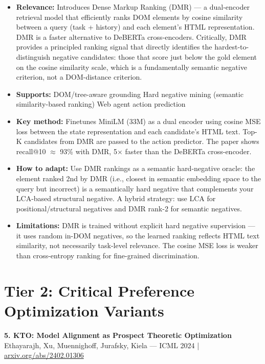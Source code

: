 \documentclass[pdflatex,sn-mathphys-num]{sn-jnl}
\theoremstyle{thmstyleone}
\theoremstyle{thmstyletwo}
\theoremstyle{thmstylethree}
\begin{document}
\begin{itemize}
    \item \textbf{Relevance:} Introduces Dense Markup Ranking (DMR) --- a dual-encoder retrieval model that efficiently ranks DOM elements by cosine similarity between a query (task + history) and each element's HTML representation. DMR is a faster alternative to DeBERTa cross-encoders. Critically, DMR provides a principled ranking signal that directly identifies the hardest-to-distinguish negative candidates: those that score just below the gold element on the cosine similarity scale, which is a fundamentally semantic negative criterion, not a DOM-distance criterion.
    \item \textbf{Supports:} \checkmark DOM/tree-aware grounding \checkmark Hard negative mining (semantic similarity-based ranking) \checkmark Web agent action prediction
    \item \textbf{Key method:} Finetunes MiniLM (33M) as a dual encoder using cosine MSE loss between the state representation and each candidate's HTML text. Top-K candidates from DMR are passed to the action predictor. The paper shows recall@10 $\approx$ 93\% with DMR, 5$\times$ faster than the DeBERTa cross-encoder.
    \item \textbf{How to adapt:} Use DMR rankings as a semantic hard-negative oracle: the element ranked 2nd by DMR (i.e., closest in semantic embedding space to the query but incorrect) is a semantically hard negative that complements your LCA-based structural negative. A hybrid strategy: use LCA for positional/structural negatives and DMR rank-2 for semantic negatives.
    \item \textbf{Limitations:} DMR is trained without explicit hard negative supervision --- it uses random in-DOM negatives, so the learned ranking reflects HTML text similarity, not necessarily task-level relevance. The cosine MSE loss is weaker than cross-entropy ranking for fine-grained discrimination.
\end{itemize}

\section{Tier 2: Critical Preference Optimization Variants}

\textbf{5. KTO: Model Alignment as Prospect Theoretic Optimization} \\
Ethayarajh, Xu, Muennighoff, Jurafsky, Kiela --- ICML 2024 | \href{https://arxiv.org/abs/2402.01306}{arxiv.org/abs/2402.01306}
\end{document}
